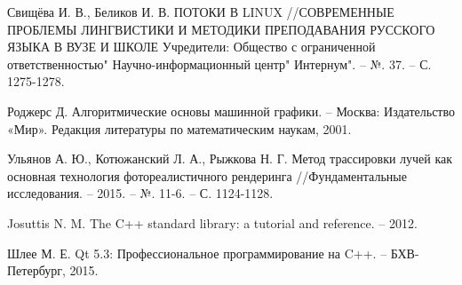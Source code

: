 \renewcommand{\bibname}{Список использованных источников}
\begin{thebibliography}{100}

Свищёва И. В., Беликов И. В. ПОТОКИ В LINUX //СОВРЕМЕННЫЕ ПРОБЛЕМЫ ЛИНГВИСТИКИ И МЕТОДИКИ ПРЕПОДАВАНИЯ РУССКОГО ЯЗЫКА В ВУЗЕ И ШКОЛЕ Учредители: Общество с ограниченной ответственностью" Научно-информационный центр" Интернум". – №. 37. – С. 1275-1278.

Роджерс Д. Алгоритмические основы машинной графики. – Москва: Издательство «Мир». Редакция литературы по математическим наукам, 2001.

Ульянов А. Ю., Котюжанский Л. А., Рыжкова Н. Г. Метод трассировки лучей как основная технология фотореалистичного рендеринга //Фундаментальные исследования. – 2015. – №. 11-6. – С. 1124-1128.

Josuttis N. M. The C++ standard library: a tutorial and reference. – 2012.



Шлее М. Е. Qt 5.3: Профессиональное программирование на C++. – БХВ-Петербург, 2015.

\end{thebibliography}

\newpage